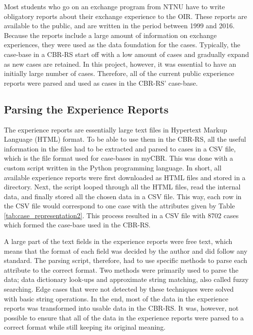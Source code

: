 Most students who go on an exchange program from NTNU have to write obligatory reports about their exchange experience to the OIR. These reports are available to the public, and are written in the period between 1999 and 2016. Because the reports include a large amount of information on exchange experiences, they were used as the data foundation for the cases. Typically, the case-base in a CBR-RS start off with a low amount of cases and gradually expand as new cases are retained. In this project, however, it was essential to have an initially large number of cases. Therefore, all of the current public experience reports were parsed and used as cases in the CBR-RS' case-base. 

\subsection{Parsing the Experience Reports}\label{sec:parsing_experience_reports}

The experience reports are essentially large text files in Hypertext Markup Language (HTML) format. To be able to use them in the CBR-RS, all the useful information in the files had to be extracted and parsed to cases in a CSV file, which is the file format used for case-bases in myCBR. This was done with a custom script written in the Python programming language. In short, all available experience reports were first downloaded as HTML files and stored in a directory. Next, the script looped through all the HTML files, read the internal data, and finally stored all the chosen data in a CSV file. This way, each row in the CSV file would correspond to one case with the attributes given by Table \ref{tab:case_representation2}. This process resulted in a CSV file with 8702 cases which formed the case-base used in the CBR-RS.

A large part of the text fields in the experience reports were free text, which means that the format of each field was decided by the author and did follow any standard. The parsing script, therefore, had to use specific methods to parse each attribute to the correct format. Two methods were primarily used to parse the data; data dictionary look-ups and approximate string matching, also called fuzzy searching. Edge cases that were not detected by these techniques were solved with basic string operations. In the end, most of the data in the experience reports was transformed into usable data in the CBR-RS. It was, however, not possible to ensure that all of the data in the experience reports were parsed to a correct format while still keeping its original meaning.

